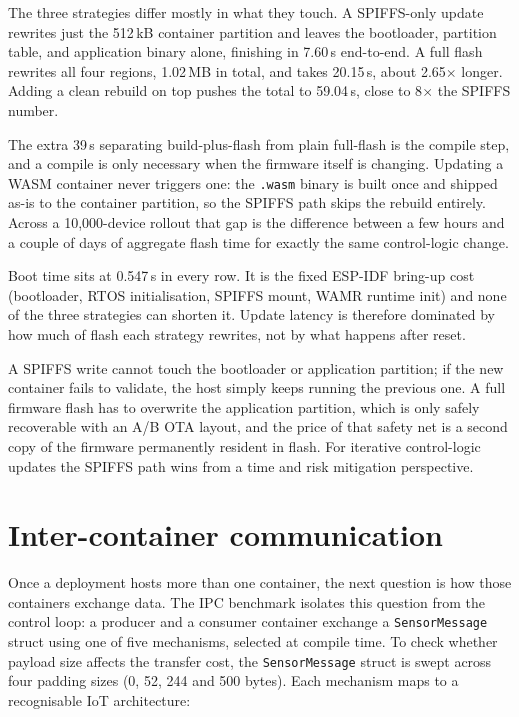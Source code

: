 \documentclass[12pt, a4paper]{report}
\begin{document}
The three strategies differ mostly in what they touch. A SPIFFS-only update rewrites just the 512\,kB container partition and leaves the bootloader, partition table, and application binary alone, finishing in 7.60\,s end-to-end. A full flash rewrites all four regions, 1.02\,MB in total, and takes 20.15\,s, about 2.65$\times$ longer. Adding a clean rebuild on top pushes the total to 59.04\,s, close to 8$\times$ the SPIFFS number. 

The extra 39\,s separating build-plus-flash from plain full-flash is the compile step, and a compile is only necessary when the firmware itself is changing. Updating a WASM container never triggers one: the \texttt{.wasm} binary is built once and shipped as-is to the container partition, so the SPIFFS path skips the rebuild entirely. Across a 10{,}000-device rollout that gap is the difference between a few hours and a couple of days of aggregate flash time for exactly the same control-logic change.

Boot time sits at 0.547\,s in every row. It is the fixed ESP-IDF bring-up cost (bootloader, RTOS initialisation, SPIFFS mount, WAMR runtime init) and none of the three strategies can shorten it. Update latency is therefore dominated by how much of flash each strategy rewrites, not by what happens after reset. 

A SPIFFS write cannot touch the bootloader or application partition; if the new container fails to validate, the host simply keeps running the previous one. A full firmware flash has to overwrite the application partition, which is only safely recoverable with an A/B OTA layout, and the price of that safety net is a second copy of the firmware permanently resident in flash. For iterative control-logic updates the SPIFFS path wins from a time and risk mitigation perspective.

\section{Inter-container communication}
\label{sec:containerization-ipc}

Once a deployment hosts more than one container, the next question is how those containers exchange data. The IPC benchmark isolates this question from the control loop: a producer and a consumer container exchange a \texttt{SensorMessage} struct using one of five mechanisms, selected at compile time. To check whether payload size affects the transfer cost, the \texttt{SensorMessage} struct is swept across four padding sizes (0, 52, 244 and 500 bytes). Each mechanism maps to a recognisable IoT architecture:
\end{document}
